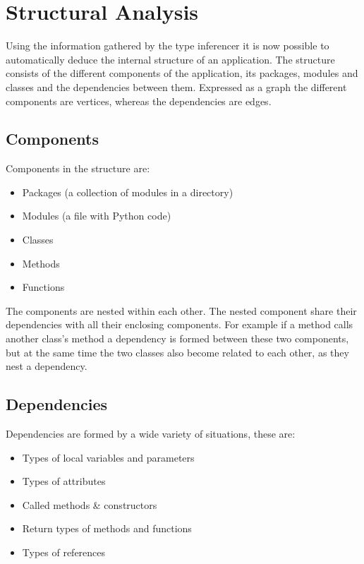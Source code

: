 \documentclass[12pt,halfparskip,DIV11,BCOR10mm]{scrreprt}
\begin{document}
\chapter{Structural Analysis}

Using the information gathered by the type inferencer it is now possible to automatically deduce the internal structure of an application. The structure consists of the different components of the application, its packages, modules and classes and the dependencies between them. Expressed as a graph the different components are vertices, whereas the dependencies are edges.

\section{Components}

Components in the structure are:

\begin{itemize}
    \item Packages (a collection of modules in a directory)
    \item Modules (a file with Python code)
    \item Classes
    \item Methods
    \item Functions
\end{itemize}

The components are nested within each other. The nested component share their dependencies with all their enclosing components. For example if a method calls another class's method a dependency is formed between these two components, but at the same time the two classes also become related to each other, as they nest a dependency. 

\section{Dependencies}

Dependencies are formed by a wide variety of situations, these are:

\begin{itemize}
    \item Types of local variables and parameters
    \item Types of attributes
    \item Called methods \& constructors
    \item Return types of methods and functions
    \item Types of references
\end{itemize}
\end{document}

